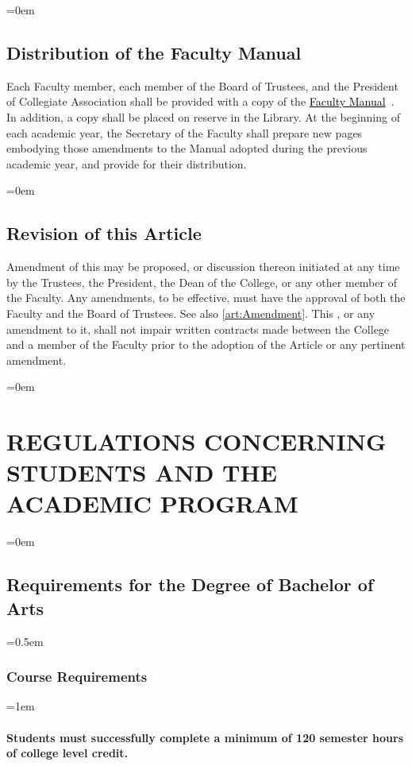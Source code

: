 \documentclass{manual}
\let\stdsection\section %
\renewcommand\section{\newpage\stdsection}
\newcommand{\keyword}[1]{\textcolor{black}{#1}}
\newcommand{\facman}{\keyword{\underline{Faculty Manual}}~}
\let\oldsection\section
\renewcommand\section{\leftskip=0em\oldsection}
\let\oldsubsection\subsection
\renewcommand\subsection{\leftskip=0em\oldsubsection}
\let\oldsubsubsection\subsubsection
\renewcommand\subsubsection{\leftskip=0.5em\oldsubsubsection}
\let\oldparagraph\paragraph
\renewcommand\paragraph{\leftskip=1em\oldparagraph}
\begin{document}
	\subsection{Distribution of the Faculty Manual}
	Each Faculty member, each member of the Board of Trustees, and the President of Collegiate Association shall be provided with a copy of the \facman. In addition, a copy shall be placed on reserve in the Library. At the beginning of each academic year, the Secretary of the Faculty shall prepare new pages embodying those amendments to the Manual adopted during the previous academic year, and provide for their distribution.

	\subsection{Revision of this Article}\label{sec:Revision}
	Amendment of this  may be proposed, or discussion thereon initiated at any time by the Trustees, the President, the Dean of the College, or any other member of the Faculty. Any amendments, to be effective, must have the approval of both the Faculty and the Board of Trustees. See also \cref{art:Amendment}. This , or any amendment to it, shall not impair written contracts made between the College and a member of the Faculty prior to the adoption of the Article or any pertinent amendment.

\section{REGULATIONS CONCERNING STUDENTS AND THE ACADEMIC PROGRAM}\label{art:RegulationsConcerningStudentStatus}

	\subsection{Requirements for the Degree of Bachelor of Arts}

		\subsubsection{Course Requirements}

			\paragraph{Students must successfully complete a minimum of 120 semester hours of college level credit.}
\end{document}
